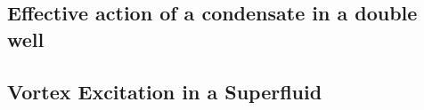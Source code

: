% 
% 


% 
% 
% 
% 
% 
% 



\setcounter{section}{8}
\setcounter{subsection}{0}
\subsection{Effective action of a condensate in a double well}

\subsection{Vortex Excitation in a Superfluid}



% 








